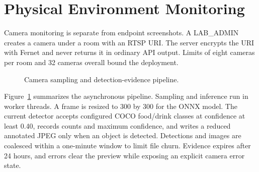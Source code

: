 \documentclass[12pt,a4paper]{report}
\begin{document}
\section{Physical Environment Monitoring}
Camera monitoring is separate from endpoint screenshots. A LAB\_ADMIN creates
a camera under a room with an RTSP URI. The server encrypts the URI with
Fernet and never returns it in ordinary API output. Limits of eight cameras
per room and 32 cameras overall bound the deployment.

\begin{figure}[H]
\centering
{}
\caption{Camera sampling and detection-evidence pipeline.}
\label{fig:camera-detection-pipeline}
\end{figure}

Figure~\ref{fig:camera-detection-pipeline} summarizes the asynchronous
pipeline. Sampling and inference run in worker threads. A frame is resized to
300 by 300 for the ONNX model. The current detector accepts configured COCO
food/drink classes at confidence at least 0.40, records counts and maximum
confidence, and writes a reduced annotated JPEG only when an object is
detected. Detections and images are coalesced within a one-minute window to
limit file churn. Evidence expires after 24 hours, and errors clear the
preview while exposing an explicit camera error state.
\end{document}
